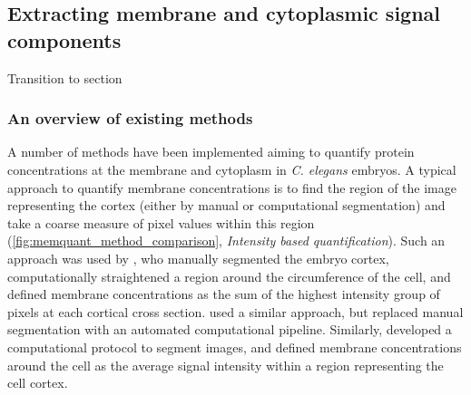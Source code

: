\documentclass[12pt]{"article"}
\begin{document}
\clearpage
\subsection{Extracting membrane and cytoplasmic signal components}
\label{section:memquant}

Transition to section

\subsubsection{An overview of existing methods}

A number of methods have been implemented aiming to quantify protein concentrations at the membrane and cytoplasm in \textit{C. elegans} embryos. A typical approach to quantify membrane concentrations is to find the region of the image representing the cortex (either by manual or computational segmentation) and take a coarse measure of pixel values within this region (\cref{fig:memquant_method_comparison}, \textit{Intensity based quantification}). Such an approach was used by \textcite{Goehring2011a}, who manually segmented the embryo cortex, computationally straightened a region around the circumference of the cell, and defined membrane concentrations as the sum of the highest intensity group of pixels at each cortical cross section. \textcite{Hubatsch2019a} used a similar approach, but replaced manual segmentation with an automated computational pipeline. Similarly, \textcite{Zhang2017} developed a computational protocol to segment images, and defined membrane concentrations around the cell as the average signal intensity within a region representing the cell cortex.\\
\end{document}
